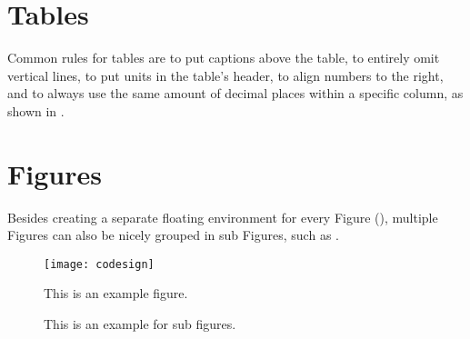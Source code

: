 \section{Tables}
\begin{table}[t]
  \caption{A very simple example table.}
  \label{tab:example}
  \centering
\end{table}

Common rules for tables are to put captions above the table, to entirely omit
vertical lines, to put units in the table's header, to align numbers to the
right, and to always use the same amount of decimal places within a specific
column, as shown in .

\section{Figures}
Besides creating a separate floating environment for every Figure
(), multiple Figures can also be nicely grouped in sub
Figures, such as .

\begin{figure}[t]
  \centering
  \texttt{[image: codesign]}
  \caption{This is an example figure.}
  \label{fig:example}
\end{figure}

\begin{figure}[t]
  \centering
  \hfill
  \hfill
  \hfill\null
  \caption{This is an example for sub figures.}
  \label{fig:subfig}
\end{figure}

